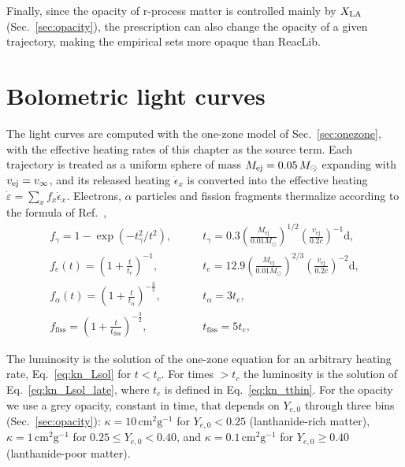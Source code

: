 Finally, since the opacity of r-process matter is controlled mainly by $X_{\rm LA}$ (Sec.~\ref{sec:opacity}), the prescription can also change the opacity of a given trajectory, making the empirical sets more opaque than ReacLib.

\section{Bolometric light curves}\label{sec:res_lum}

The light curves are computed with the one-zone model of Sec.~\ref{sec:onezone}, with the effective heating rates of this chapter as the source term.
Each trajectory is treated as a uniform sphere of mass $M_{\rm ej}=0.05\,M_\odot$ expanding with $v_{\rm ej}=v_\infty$, and its released heating $\dot\epsilon_x$ is converted into the effective heating $\dot\varepsilon=\sum_x f_x\dot\epsilon_x$.
Electrons, $\alpha$ particles and fission fragments thermalize according to the formula of Ref.~\cite{kasen_radioactive_2019},
\begin{align}\label{eq:res_fineff}
    f_\gamma=1-\exp(-t_\gamma^2/t^2),&\qquad t_\gamma=0.3\left(\frac{M_{\mathrm{ej}}}{0.01M_\odot}\right)^{1/2}\left(\frac{v_{\mathrm{ej}}}{0.2c}\right)^{-1}\mathrm d,\\
  f_e(t)=\left(1+\frac{t}{t_e}\right)^{-1},&\qquad t_e=12.9\left(\frac{M_{\mathrm{ej}}}{0.01M_\odot}\right)^{2/3}\left(\frac{v_{\mathrm{ej}}}{0.2c}\right)^{-2}\mathrm d,\\
    f_\alpha(t)=\left(1+\frac{t}{t_\alpha}\right)^{-\frac{3}{2}},&\qquad t_\alpha=3t_e,\\
    f_{\mathrm{fiss}}=\left(1+\frac{t}{t_{\mathrm{fiss}}}\right)^{-\frac{3}{2}},&\qquad t_{\mathrm{fiss}}=5t_e,
\end{align}

The luminosity is the solution of the one-zone equation for an arbitrary heating rate, Eq.~\ref{eq:kn_Lsol} for $t<t_c$.
For times $>t_c$ the luminosity is the solution of Eq.~\ref{eq:kn_Lsol_late}, where $t_c$ is defined in Eq.~\ref{eq:kn_tthin}.
For the opacity we use a grey opacity, constant in time, that depends on $Y_{e,0}$ through three bins (Sec.~\ref{sec:opacity}): $\kappa=10\,\mathrm{cm}^2\mathrm g^{-1}$ for $Y_{e,0}<0.25$ (lanthanide-rich matter), $\kappa=1\,\mathrm{cm}^2\mathrm g^{-1}$ for $0.25\leq Y_{e,0}<0.40$, and $\kappa=0.1\,\mathrm{cm}^2\mathrm g^{-1}$ for $Y_{e,0}\geq0.40$ (lanthanide-poor matter).

